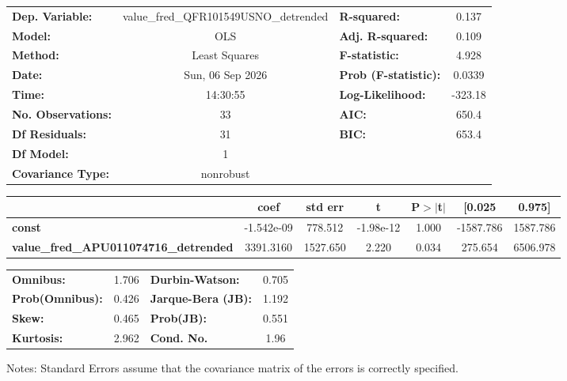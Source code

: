 \begin{center}
\begin{tabular}{lclc}
\toprule
\textbf{Dep. Variable:}                       & value\_fred\_QFR101549USNO\_detrended & \textbf{  R-squared:         } &     0.137   \\
\textbf{Model:}                               &                  OLS                  & \textbf{  Adj. R-squared:    } &     0.109   \\
\textbf{Method:}                              &             Least Squares             & \textbf{  F-statistic:       } &     4.928   \\
\textbf{Date:}                                &            Sun, 06 Sep 2026           & \textbf{  Prob (F-statistic):} &   0.0339    \\
\textbf{Time:}                                &                14:30:55               & \textbf{  Log-Likelihood:    } &   -323.18   \\
\textbf{No. Observations:}                    &                     33                & \textbf{  AIC:               } &     650.4   \\
\textbf{Df Residuals:}                        &                     31                & \textbf{  BIC:               } &     653.4   \\
\textbf{Df Model:}                            &                      1                & \textbf{                     } &             \\
\textbf{Covariance Type:}                     &               nonrobust               & \textbf{                     } &             \\
\bottomrule
\end{tabular}
\begin{tabular}{lcccccc}
                                              & \textbf{coef} & \textbf{std err} & \textbf{t} & \textbf{P$> |$t$|$} & \textbf{[0.025} & \textbf{0.975]}  \\
\midrule
\textbf{const}                                &   -1.542e-09  &      778.512     & -1.98e-12  &         1.000        &    -1587.786    &     1587.786     \\
\textbf{value\_fred\_APU011074716\_detrended} &    3391.3160  &     1527.650     &     2.220  &         0.034        &      275.654    &     6506.978     \\
\bottomrule
\end{tabular}
\begin{tabular}{lclc}
\textbf{Omnibus:}       &  1.706 & \textbf{  Durbin-Watson:     } &    0.705  \\
\textbf{Prob(Omnibus):} &  0.426 & \textbf{  Jarque-Bera (JB):  } &    1.192  \\
\textbf{Skew:}          &  0.465 & \textbf{  Prob(JB):          } &    0.551  \\
\textbf{Kurtosis:}      &  2.962 & \textbf{  Cond. No.          } &     1.96  \\
\bottomrule
\end{tabular}
\end{center}

Notes: \newline
 [1] Standard Errors assume that the covariance matrix of the errors is correctly specified.